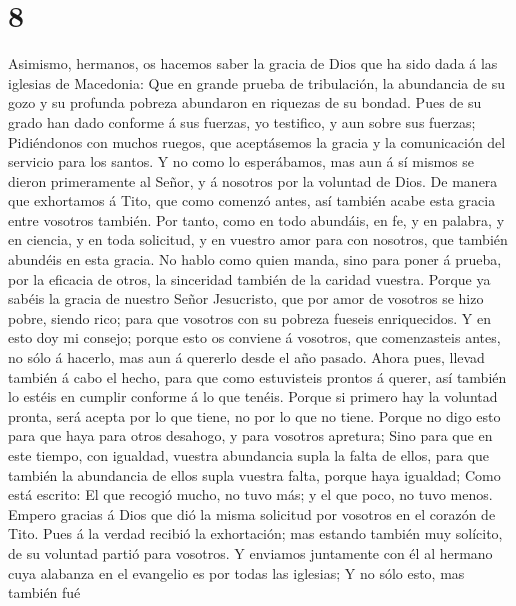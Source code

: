 \hypertarget{section-7}{%
\section{8}\label{section-7}}

 Asimismo, hermanos, os hacemos saber la gracia de Dios que
ha sido dada á las iglesias de Macedonia:  Que en grande
prueba de tribulación, la abundancia de su gozo y su profunda pobreza
abundaron en riquezas de su bondad.  Pues de su grado han
dado conforme á sus fuerzas, yo testifico, y aun sobre sus fuerzas;
 Pidiéndonos con muchos ruegos, que aceptásemos la gracia y
la comunicación del servicio para los santos.  Y no como lo
esperábamos, mas aun á sí mismos se dieron primeramente al Señor, y á
nosotros por la voluntad de Dios.  De manera que exhortamos
á Tito, que como comenzó antes, así también acabe esta gracia entre
vosotros también.  Por tanto, como en todo abundáis, en fe,
y en palabra, y en ciencia, y en toda solicitud, y en vuestro amor para
con nosotros, que también abundéis en esta gracia.  No hablo
como quien manda, sino para poner á prueba, por la eficacia de otros, la
sinceridad también de la caridad vuestra.  Porque ya sabéis
la gracia de nuestro Señor Jesucristo, que por amor de vosotros se hizo
pobre, siendo rico; para que vosotros con su pobreza fueseis
enriquecidos.  Y en esto doy mi consejo; porque esto os
conviene á vosotros, que comenzasteis antes, no sólo á hacerlo, mas aun
á quererlo desde el año pasado.  Ahora pues, llevad también
á cabo el hecho, para que como estuvisteis prontos á querer, así también
lo estéis en cumplir conforme á lo que tenéis.  Porque si
primero hay la voluntad pronta, será acepta por lo que tiene, no por lo
que no tiene.  Porque no digo esto para que haya para otros
desahogo, y para vosotros apretura;  Sino para que en este
tiempo, con igualdad, vuestra abundancia supla la falta de ellos, para
que también la abundancia de ellos supla vuestra falta, porque haya
igualdad;  Como está escrito: El que recogió mucho, no tuvo
más; y el que poco, no tuvo menos.  Empero gracias á Dios
que dió la misma solicitud por vosotros en el corazón de Tito.
 Pues á la verdad recibió la exhortación; mas estando
también muy solícito, de su voluntad partió para vosotros. 
Y enviamos juntamente con él al hermano cuya alabanza en el evangelio es
por todas las iglesias;  Y no sólo esto, mas también fué
